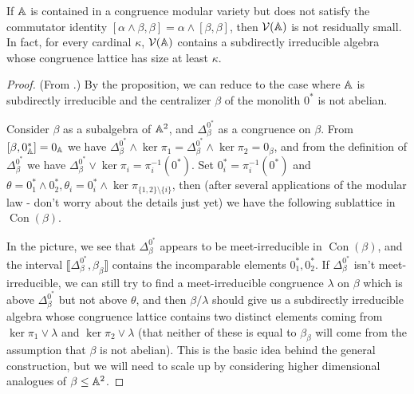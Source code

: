 \documentclass[letterpaper,11pt]{article}
\DeclareMathOperator{\Con}{Con}
\begin{document}
\begin{thm} If $\mathbb{A}$ is contained in a congruence modular variety but does not satisfy the commutator identity $[\alpha \wedge \beta,\beta] = \alpha \wedge [\beta,\beta]$, then $\mathcal{V}(\mathbb{A})$ is not residually small. In fact, for every cardinal $\kappa$, $\mathcal{V}(\mathbb{A})$ contains a subdirectly irreducible algebra whose congruence lattice has size at least $\kappa$.
\end{thm}
\begin{proof} (From \cite{commutator-theory}.) By the proposition, we can reduce to the case where $\mathbb{A}$ is subdirectly irreducible and the centralizer $\beta$ of the monolith $0^*$ is not abelian.

Consider $\beta$ as a subalgebra of $\mathbb{A}^2$, and $\Delta_\beta^{0^*}$ as a congruence on $\beta$. From $[\beta,0_{\mathbb{A}}^*] = 0_{\mathbb{A}}$ we have $\Delta_\beta^{0^*} \wedge \ker \pi_1 = \Delta_\beta^{0^*} \wedge \ker \pi_2 = 0_\beta$, and from the definition of $\Delta_\beta^{0^*}$ we have $\Delta_\beta^{0^*} \vee \ker \pi_i = \pi_i^{-1}(0^*)$. Set $0^*_i = \pi_i^{-1}(0^*)$ and $\theta = 0^*_1 \wedge 0^*_2, \theta_i = 0^*_i \wedge \ker \pi_{\{1,2\}\setminus \{i\}}$, then (after several applications of the modular law - don't worry about the details just yet) we have the following sublattice in $\Con(\beta)$.
\begin{center}
\end{center}
In the picture, we see that $\Delta_\beta^{0^*}$ appears to be meet-irreducible in $\Con(\beta)$, and the interval $\llbracket \Delta_\beta^{0^*}, \beta_\beta\rrbracket$ contains the incomparable elements $0^*_1, 0^*_2$. If $\Delta_\beta^{0^*}$ isn't meet-irreducible, we can still try to find a meet-irreducible congruence $\lambda$ on $\beta$ which is above $\Delta_\beta^{0^*}$ but not above $\theta$, and then $\beta/\lambda$ should give us a subdirectly irreducible algebra whose congruence lattice contains two distinct elements coming from $\ker \pi_1 \vee \lambda$ and $\ker \pi_2 \vee \lambda$ (that neither of these is equal to $\beta_\beta$ will come from the assumption that $\beta$ is not abelian). This is the basic idea behind the general construction, but we will need to scale up by considering higher dimensional analogues of $\beta \le \mathbb{A}^2$.


\end{proof}
\end{document}
